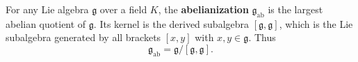 For any Lie algebra $\mathfrak{g}$ over a field $K$, the \textbf{abelianization} $\mathfrak{g}_{\mathrm{ab}}$ is the largest abelian quotient of $\mathfrak{g}$. Its kernel is the derived subalgebra $[\mathfrak{g}, \mathfrak{g}]$, which is the Lie subalgebra generated by all brackets $[x, y]$ with $x, y \in \mathfrak{g}$. Thus
$$
\mathfrak{g}_{\mathrm{ab}} = \mathfrak{g} / [\mathfrak{g}, \mathfrak{g}].
$$
